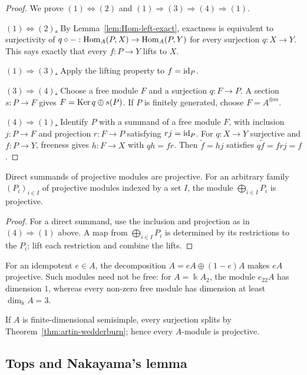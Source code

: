 \begin{proof}
We prove $(1)\Leftrightarrow(2)$ and $(1)\Rightarrow(3)\Rightarrow(4)\Rightarrow(1)$.

\underline{$(1)\Leftrightarrow(2)$.}
By Lemma~\ref{lem:Hom-left-exact}, exactness is equivalent to surjectivity of
$q\circ-:\operatorname{Hom}\nolimits_A(P,X)\to\operatorname{Hom}\nolimits_A(P,Y)$ for every surjection $q:X\to Y$.
This says exactly that every $f:P\to Y$ lifts to $X$.

\underline{$(1)\Rightarrow(3)$.}
Apply the lifting property to $f=\operatorname{id}_P$.

\underline{$(3)\Rightarrow(4)$.}
Choose a free module $F$ and a surjection $q:F\to P$.
A section $s:P\to F$ gives $F=\operatorname{Ker}\nolimits q\oplus s(P)$.
If $P$ is finitely generated, choose $F=A^{\oplus m}$.

\underline{$(4)\Rightarrow(1)$.}
Identify $P$ with a summand of a free module $F$, with inclusion $j:P\to F$ and projection $r:F\to P$ satisfying $rj=\operatorname{id}_P$.
For $q:X\to Y$ surjective and $f:P\to Y$, freeness gives $h:F\to X$ with $qh=fr$.
Then $\widetilde f=hj$ satisfies $q\widetilde f=frj=f$.
\end{proof}

\begin{corollary}\label{cor:projective-sums}
Direct summands of projective modules are projective.
For an arbitrary family $(P_i)_{i\in I}$ of projective modules indexed by a set $I$, the module $\bigoplus_{i\in I}P_i$ is projective.
\end{corollary}

\begin{proof}
For a direct summand, use the inclusion and projection as in $(4)\Rightarrow(1)$ above.
A map from $\bigoplus_{i\in I}P_i$ is determined by its restrictions to the $P_i$; lift each restriction and combine the lifts.
\end{proof}

\begin{example}\label{ex:projective-idempotents}
For an idempotent $e\in A$, the decomposition $A=eA\oplus(1-e)A$ makes $eA$ projective.
Such modules need not be free: for $A=\Bbbk A_2$, the module $e_{22}A$ has dimension $1$, whereas every non-zero free module has dimension at least $\dim_\Bbbk A=3$.
\end{example}


If $A$ is finite-dimensional semisimple, every surjection splits by Theorem~\ref{thm:artin-wedderburn}; hence every $A$-module is projective.

\subsection{Tops and Nakayama's lemma}

